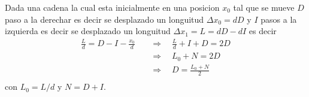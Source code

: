 
\begin{answer}
    Dada una cadena la cual esta inicialmente en una posicion $x_0$ tal que se mueve $D$ paso a la derechar es decir se desplazado un longuitud
    $\Delta x_0 = dD$ y $I$ pasos a la izquierda es decir se desplazado un longuitud $\Delta x_1 = L = d D - d I$ es decir 
    \begin{align*}
        \frac Ld = D - I - \frac{x_0}d  \quad &\Rightarrow \quad \frac Ld + I + D= 2D\\
        &\Rightarrow \quad L_0 + N= 2D\\
        &\Rightarrow \quad D= \frac{L_0 + N}2\\
    \end{align*}
    con $L_0 = L/d$ y $N = D + I$.
\end{answer}